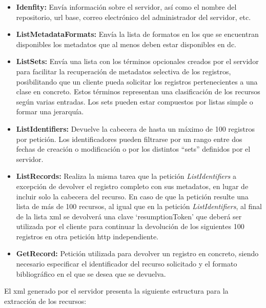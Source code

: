 \begin{itemize}
	\item \textbf{Idenfity:} Envía información sobre el servidor, así como el nombre del repositorio, \acrshort{url} base, correo electrónico del administrador del servidor, etc.
	\item \textbf{ListMetadataFormats:} Envía la lista de formatos en los que se encuentran disponibles los metadatos que al menos deben estar disponibles en \acrshort{dc}.
	\item \textbf{ListSets:} Envía una lista con los términos opcionales creados por el servidor para facilitar la recuperación de metadatos selectiva de los registros, posibilitando que un cliente pueda solicitar los registros pertenecientes a una clase en concreto. Estos términos representan una clasificación de los recursos según varias entradas. Los sets pueden estar compuestos por listas simple o formar una jerarquía.
	\item \textbf{ListIdentifiers: } Devuelve la cabecera de hasta un máximo de 100 registros por petición. Los identificadores pueden filtrarse por un rango entre dos fechas de creación o modificación o por los distintos ``sets'' definidos por el servidor.
	\item \textbf{ListRecords: } Realiza la misma tarea que la petición \textit{ListIdentifiers} a excepción de devolver el registro completo con sus metadatos, en lugar de incluir solo la cabecera del recurso. En caso de que la petición resulte una lista de más de 100 recursos, al igual que en la petición \textit{ListIdentifiers}, al final de la lista \acrshort{xml} se devolverá una clave `resumptionToken' que deberá ser utilizada por el cliente para continuar la devolución de los siguientes 100 registros en otra petición \acrshort{http} independiente.
	\item \textbf{GetRecord: } Petición utilizada para devolver un registro en concreto, siendo necesario especificar el identificador del recurso solicitado y el formato bibliográfico en el que se desea que se devuelva.
\end{itemize}

\clearpage



El \acrshort{xml} generado por el servidor presenta la siguiente estructura para la extracción de los recursos:

